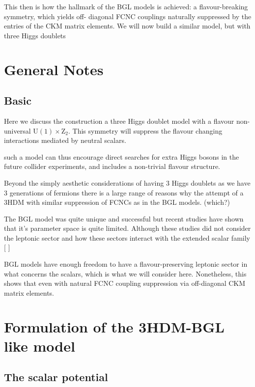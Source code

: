 This then is how the hallmark of the BGL models is achieved: a flavour-breaking symmetry, which yields off-
diagonal FCNC couplings naturally suppressed by the entries of the CKM matrix elements. We will now build
a similar model, but with three Higgs doublets


\section{General Notes}

\subsection{Basic}

Here we discuss the construction a three Higgs doublet model with a flavour non-universal $\mathrm{U(1)}\times\mathrm{Z_2}$. This symmetry will suppress the flavour changing interactions mediated by neutral scalars. 

such a model can thus encourage direct searches for extra Higgs bosons in the future collider experiments, and includes a
non-trivial flavour structure.

Beyond the simply aesthetic considerations of having 3 Higgs doublets as we have 3 generations of fermions there is a large range of reasons why the attempt of a 3HDM with similar suppression of FCNCs as in the BGL models. (which?) 

The BGL model was quite unique and successful but recent studies have shown that it's parameter space is quite limited. Although these studies did not consider the leptonic sector and how these sectors interact with the extended scalar family [
]

BGL models have enough freedom to have a flavour-preserving leptonic sector in what concerns the scalars, which is what we will consider here. Nonetheless, this shows that even with natural FCNC coupling suppression via off-diagonal CKM matrix elements. 

\section{Formulation of the 3HDM-BGL like model}

\subsection{The scalar potential}

